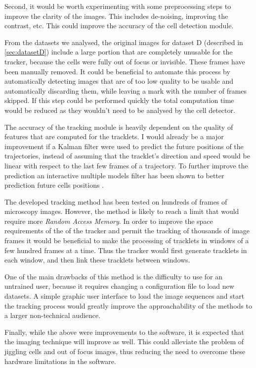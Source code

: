 Second, it would be worth experimenting with some preprocessing steps to improve the clarity of the images. This includes de-noising, improving the contrast, etc. This could improve the accuracy of the cell detection module.

From the datasets we analysed, the original images for dataset D (described in \cref{sec:datasetD}) include a large portion that are completely unusable for the tracker, because the cells were fully out of focus or invisible. These frames have been manually removed. It could be beneficial to automate this process by automatically detecting images that are of too low quality to be usable and automatically discarding them, while leaving a mark with the number of frames skipped. If this step could be performed quickly the total computation time would be reduced as they wouldn't need to be analysed by the cell detector.

The accuracy of the tracking module is heavily dependent on the quality of features that are computed for the tracklets. I would already be a major improvement if a Kalman filter were used to predict the future positions of the trajectories, instead of assuming that the tracklet's direction and speed would be linear with respect to the last few frames of a trajectory. To further improve the prediction an interactive multiple models filter has been shown to better prediction future cells positions \addref{}.

The developed tracking method has been tested on hundreds of frames of microscopy images. However, the method is likely to reach a limit that would require more \textit{Random Access Memory}. In order to improve the space requirements of the of the tracker and permit the tracking of thousands of image frames it would be beneficial to make the processing of tracklets in windows of a few hundred frames at a time. Thus the tracker would first generate tracklets in each window, and then link these tracklets between windows. 

One of the main drawbacks of this method is the difficulty to use for an untrained user, because it requires changing a configuration file to load new datasets. A simple graphic user interface to load the image sequences and start the tracking process would greatly improve the approachability of the methods to a larger non-technical audience.

Finally, while the above were improvements to the software, it is expected that the imaging technique will improve as well. This could alleviate the problem of jiggling cells and out of focus images, thus reducing the need to overcome these hardware limitations in the software.